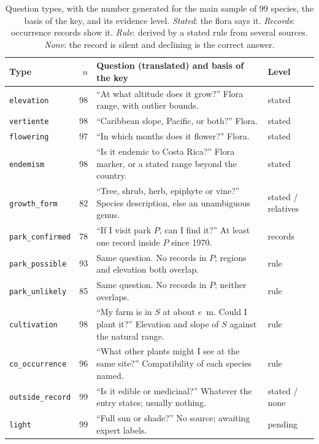 \documentclass[11pt,a4paper]{article}
\newcommand{\vt}[1]{\texttt{#1}}          %
\begin{document}
\begin{table}[htbp]
\centering
\caption{Question types, with the number generated for the main sample of 99 species,
the basis of the key, and its evidence level. \emph{Stated}: the flora says it.
\emph{Records}: occurrence records show it. \emph{Rule}: derived by a stated rule
from several sources. \emph{None}: the record is silent and declining is the correct
answer.}
\label{tab:questions}
\small
\begin{tabularx}{\textwidth}{lrXl}
\toprule
Type & $n$ & Question (translated) and basis of the key & Level \\
\midrule
\vt{elevation}       & 98 & ``At what altitude does it grow?'' Flora range, with outlier bounds. & stated \\
\vt{vertiente}       & 98 & ``Caribbean slope, Pacific, or both?'' Flora. & stated \\
\vt{flowering}       & 97 & ``In which months does it flower?'' Flora. & stated \\
\vt{endemism}        & 98 & ``Is it endemic to Costa Rica?'' Flora marker, or a stated range beyond the country. & stated \\
\vt{growth\_form}    & 82 & ``Tree, shrub, herb, epiphyte or vine?'' Species description, else an unambiguous genus. & stated / relatives \\
\vt{park\_confirmed} & 78 & ``If I visit park $P$, can I find it?'' At least one record inside $P$ since 1970. & records \\
\vt{park\_possible}  & 93 & Same question. No records in $P$; regions and elevation both overlap. & rule \\
\vt{park\_unlikely}  & 85 & Same question. No records in $P$; neither overlaps. & rule \\
\vt{cultivation}     & 98 & ``My farm is in $S$ at about $e$~m. Could I plant it?'' Elevation and slope of $S$ against the natural range. & rule \\
\vt{co\_occurrence}  & 96 & ``What other plants might I see at the same site?'' Compatibility of each species named. & rule \\
\vt{outside\_record} & 99 & ``Is it edible or medicinal?'' Whatever the entry states; usually nothing. & stated / none \\
\vt{light}           & 99 & ``Full sun or shade?'' No source; awaiting expert labels. & pending \\
\bottomrule
\end{tabularx}
\end{table}
\end{document}

